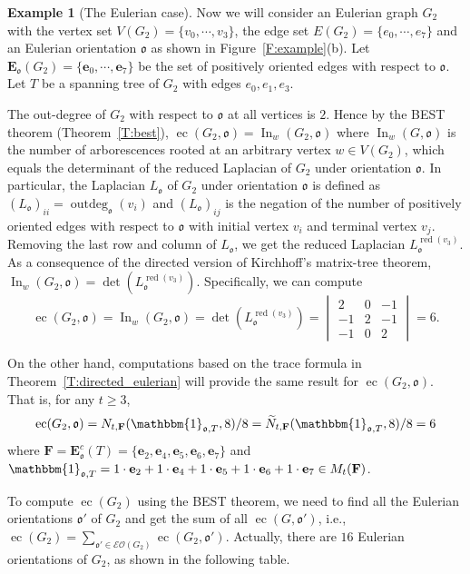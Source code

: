 \documentclass[11pt]{amsart}
\theoremstyle{plain}
\theoremstyle{definition}
\newtheorem{example}[theorem]{Example}
\newcommand{\mfrako}{{\mathfrak o}}
\newcommand{\ve}{{\mathbf e}}
\newcommand{\vE}{{\mathbf E}}
\newcommand{\vF}{{\mathbf F}}
\DeclareMathOperator{\ec}{\operatorname{ec}}
\DeclareMathOperator{\outdeg}{\operatorname{outdeg}}
\DeclareMathOperator{\In}{\operatorname{In}}
\DeclareMathOperator{\red}{\operatorname{red}}
\numberwithin{equation}{section}
\begin{document}
\begin{example}[The Eulerian case] \label{E:eulerian}
Now we will  consider an Eulerian graph $G_2$ with the vertex set $V(G_2)=\{v_0,\cdots,v_3\}$, the edge set $E(G_2)=\{e_0,\cdots,e_7\}$ and an Eulerian orientation $\mfrako$ as shown in Figure~\ref{F:example}(b).  Let $\vE_\mfrako(G_2)=\{\ve_0,\cdots,\ve_7\}$ be the set of positively oriented edges with respect to $\mfrako$. Let $T$ be a spanning tree of $G_2$ with edges $e_0,e_1,e_3$. 

 The out-degree of $G_2$ with respect to $\mfrako$ at all vertices is $2$. Hence by the BEST theorem (Theorem~\ref{T:best}), $\ec(G_2,\mfrako)=\In_w(G_2,\mfrako)$ where $\In_w(G,\mfrako)$ is the number of arborescences rooted at an arbitrary vertex $w\in V(G_2)$, which equals the determinant of the reduced Laplacian of $G_2$ under orientation $\mfrako$.  In particular, the Laplacian $L_\mfrako$ of $G_2$ under orientation $\mfrako$ is defined as $(L_\mfrako)_{ii}=\outdeg_\mfrako(v_i)$ and  $(L_\mfrako)_{ij}$ is the negation of the number of positively oriented edges with respect to $\mfrako$ with initial vertex $v_i$ and terminal vertex $v_j$. Removing the last row and column of  $L_\mfrako$, we get the reduced Laplacian $L_\mfrako^{\red(v_3)}$. As a consequence of  the directed version of Kirchhoff's matrix-tree theorem, $\In_w(G_2,\mfrako)=\det 
\left(L_\mfrako^{\red(v_3)}\right)$. Specifically, we can compute
 $$\ec(G_2,\mfrako)=\In_w(G_2,\mfrako)=\det \left(L_\mfrako^{\red(v_3)}\right)=\begin{vmatrix}
2 & 0 &-1  \\
-1 & 2& -1 \\
-1 & 0 &  2
\end{vmatrix}=6.$$

On the other hand, computations based on the trace formula in Theorem~\ref{T:directed_eulerian} will provide the same result for $\ec(G_2,\mfrako)$. That is, for any $t\geq 3$,
$$\ec(G_2,\mfrako) = N_{t,\vF}(\mathbbm{1}_{\mfrako,T},8)/8=\widetilde{N}_{t,\vF}(\mathbbm{1}_{\mfrako,T},8)/8=6$$ where $\vF=\vE_\mfrako^c(T)=\{\ve_2,\ve_4,\ve_5,\ve_6,\ve_7\}$ and $\mathbbm{1}_{\mfrako,T}= 1\cdot \ve_2+1\cdot \ve_4+1\cdot \ve_5+1\cdot \ve_6+1\cdot \ve_7 \in M_t(\vF)$. 

To compute $\ec(G_2)$ using the BEST theorem, we need to find all the Eulerian orientations $\mfrako'$ of $G_2$ and get the sum of all $\ec(G,\mfrako')$, i.e., 
$\ec(G_2)=\sum_{\mfrako'\in \mathcal{EO}(G_2)}\ec(G_2,\mfrako')$. Actually, there are $16$ Eulerian orientations of $G_2$, as shown in the following table. 


\end{example}
\end{document}
